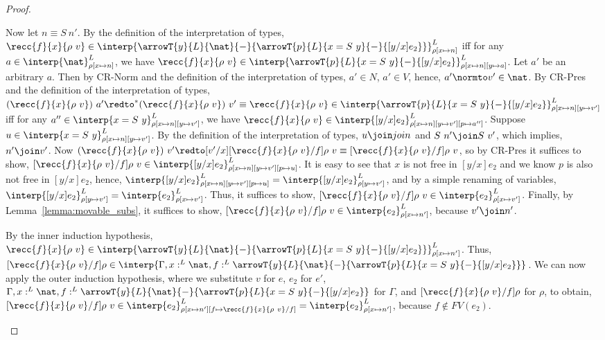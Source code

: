 \begin{proof}
\begin{itemize}
  \noindent
  Now let $n \equiv S\ n'$.  By the definition of the interpretation
  of types, $\recc{f}{x}{\rho\ v} \in
  \interp{\arrowT{y}{L}{\nat}{-}{\arrowT{p}{L}{x =
  S\ y}{-}{[y/x]e_2}}}^L_{\rho[x \mapsto n]}$ iff for any $a
  \in \interp{\nat}^L_{\rho[x \mapsto n]}$, we have
  $\recc{f}{x}{\rho\ v} \in \interp{\arrowT{p}{L}{x =
  S\ y}{-}{[y/x]e_2}}^L_{\rho[x \mapsto n][y \mapsto a]}$.  Let
  $a'$ be an arbitrary $a$. Then by CR-Norm and the definition of the
  interpretation of types, $a' \in N$, $a' \in V$, hence, $a' \normto
  v' \in \nat$.  By CR-Pres and the definition of the interpretation of
  types, $(\recc{f}{x}{\rho\ v})\ a' \redto^*
  (\recc{f}{x}{\rho\ v})\ v' \equiv \recc{f}{x}{\rho\ v} \in 
  \interp{\arrowT{p}{L}{x = S\ y}{-}{[y/x]e_2}}^L_{\rho[x \mapsto n][y \mapsto v']}$ iff
  for any $a'' \in \interp{x = S\ y}^L_{\rho[x \mapsto n][y \mapsto v']}$, we have 
  $\recc{f}{x}{\rho\ v} \in
  \interp{[y/x]e_2}^L_{\rho[x \mapsto n][y \mapsto v'][p \mapsto 
  a'']}$. Suppose $u \in \interp{x = S\ y}^L_{\rho[x \mapsto n][y \mapsto v']}$.  
  By the definition of the
  interpretation of types, $u \join join$ and $S\ n' \join S\ v'$,
  which implies, $n' \join v'$.  Now $(\recc{f}{x}{\rho\ v})\ v'
  \redto [v'/x][\recc{f}{x}{\rho\ v}/f]\rho\ v \equiv 
  [\recc{f}{x}{\rho\ v}/f]\rho\ v$, so by CR-Pres it
  suffices to show, $[\recc{f}{x}{\rho\ v}/f]\rho\ v \in
  \interp{[y/x]e_2}^L_{\rho[x \mapsto n][y \mapsto v'][p \mapsto
  u]}$.  It is easy to see that $x$ is not free in $[y/x]e_2$ and
  we know $p$ is also not free
  in $[y/x]e_2$, hence, $\interp{[y/x]e_2}^L_{\rho[x \mapsto n][y
  \mapsto v'][p \mapsto u]} = \interp{[y/x]e_2}^L_{\rho[y
  \mapsto v']}$, and by a simple renaming of variables,
  $\interp{[y/x]e_2}^L_{\rho[y \mapsto v']} =
  \interp{e_2}^L_{\rho[x \mapsto v']}$.  Thus, it suffices to show,
  $[\recc{f}{x}{\rho\ v}/f]\rho\ v \in
  \interp{e_2}^L_{\rho[x \mapsto v']}$.  Finally, by  
  Lemma~\ref{lemma:movable_subs},
  it suffices to show, $[\recc{f}{x}{\rho\ v}/f]\rho\ v \in
  \interp{e_2}^L_{\rho[x \mapsto n']}$, because $v' \join n'$.

  \noindent
  By the inner induction hypothesis, $\recc{f}{x}{\rho\ v} \in
  \interp{\arrowT{y}{L}{\nat}{-}{\arrowT{p}{L}{x =
  S\ y}{-}{[y/x]e_2}}}^L_{\rho[x \mapsto n']}$.
  Thus, $[\recc{f}{x}{\rho\ v}/f]\rho \in
  \interp{\Gamma,x:^L \nat, f:^L
  \arrowT{y}{L}{\nat}{-}{\arrowT{p}{L}{x = S\ y}{-}{[y/x]e_2}}}$.
  We can now apply the outer induction hypothesis, where we substitute
  $v$ for $e$, $e_2$ for $e'$, $\Gamma,x:^L \nat,f:^L
  \arrowT{y}{L}{\nat}{-}{\arrowT{p}{L}{x = S\ y}{-}{[y/x]e_2}}$ for
  $\Gamma$, and $[\recc{f}{x}{\rho\ v}/f]\rho$ for $\rho$,
  to obtain, $[\recc{f}{x}{\rho\ v}/f]\rho\ v \in
  \interp{e_2}^L_{\rho[x \mapsto n'][f \mapsto
  \recc{f}{x}{\rho\ v}/f]} = \interp{e_2}^L_{\rho[x \mapsto
  n']}$, because $f \not \in FV(e_2)$.


\end{itemize}
\end{proof}

